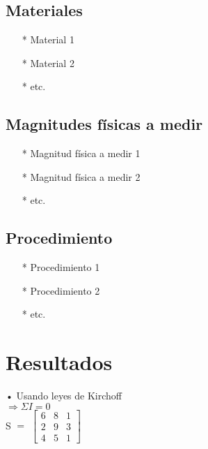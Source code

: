 \documentclass[osajnl,twocolumn,showpacs,superscriptaddress,10pt]{revtex4-1}
\begin{document}
\subsection{Materiales}

\begin{itemize}
    \item[*] Material 1
    \item[*] Material 2
    \item[*] etc.
\end{itemize}

\subsection{Magnitudes físicas a medir}

\begin{itemize}
    \item[*] Magnitud física a medir 1
    \item[*] Magnitud física a medir 2
    \item[*] etc.
\end{itemize}


\subsection{Procedimiento}

\begin{enumerate}
    \item[*] Procedimiento 1
    \item[*] Procedimiento 2
    \item[*] etc.
\end{enumerate}


\section{Resultados}
• Usando leyes de Kirchoff\\

$\Rightarrow \Sigma I = 0$\\

S $=$ $\begin{bmatrix}
6 & 8 & 1\\
2 & 9 & 3\\
4 & 5 & 1
\end{bmatrix}$\\
\end{document}
